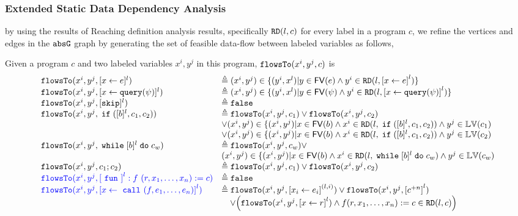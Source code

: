 \subsubsection{Extended Static Data Dependency Analysis}
\label{sec:refine-static-datadep}
by using the results of Reaching definition analysis results, specifically $\mathtt{RD}(l, c)$ for every label in a program $c$, we refine the vertices and edges in the $\mathtt{abs}{\mathtt{G}}$ graph 
by generating the set of feasible data-flow between labeled variables as follows,
\begin{defn}
  \label{def:feasible_flowsto}
  Given a program $c$ and two labeled variables $x^i, y^j$  in this program, 
  $\mathtt{flowsTo}(x^i, y^j, c)$ is 
    {\footnotesize
    \[
   \begin{array}{ll}
    \flowsto(x^i, y^j, \clabel{\assign{x}{\expr}}{}^l)  & \triangleq (x^i, y^j) \in \{ (y^i, x^l) | y \in \mathsf{FV}(\expr) 
    \land y^i \in \live(l, \clabel{\assign{x}{\expr}}^l) \}  \\
    \flowsto(x^i, y^j, \clabel{\assign{x}{\query(\qexpr)}}{}^l)  & \triangleq (x^i, y^j) \in \{ (y^i, x^l) | y \in \mathsf{FV}(\qexpr) 
    \land y^i \in \live(l,\clabel{\assign{x}{\query(\qexpr)}}^l) \}  \\
    \flowsto(x^i, y^j, [\eskip]^{l}) & \triangleq \efalse \\
    \flowsto(x^i, y^j, \eif ([b]^l, c_1, c_2))  & \triangleq \flowsto(x^i, y^j, c_1) \lor \flowsto(x^i, y^j, c_2) \\ 
        & \lor (x^i, y^j) \in
       \{(x^i,y^j) | x \in \mathsf{FV}(b) \land 
      x^i \in \live(l, \eif ([b]^l, c_1, c_2)) \land  y^j \in \lvar(c_1) \\
       &\lor (x^i, y^j) \in \{(x^i,y^j) | x \in \mathsf{FV}(b) \land 
      x^i\in \live(l, \eif ([b]^l, c_1, c_2))  \land  y^j \in \lvar(c_2) \\
       \flowsto(x^i, y^j, \ewhile [b]^l \edo c_w)  & \triangleq  \flowsto(x^i, y^j, c_w)  \lor
       \\ & 
       (x^i, y^j) \in  \{(x^i,y^j) | x \in \mathsf{FV}(b) \land 
      x^i \in \live(l,   \ewhile [b]^l \edo c_w) \land  y^j \in \lvar(c_w) \\
      \flowsto(x^i, y^j, c_1 ;c_2)  & \triangleq \flowsto(x^i, y^j, c_1) \lor \flowsto(x^i, y^j, c_2) \\
      {\highlight{\flowsto(x^i, y^j, \clabel{\efun}^l: f ~ (r, x_1, \ldots, x_n) := c) }}
       & \triangleq \efalse\\
       {\highlight{\flowsto(x^i, y^j, \clabel{\assign{x}{\ecall(f, e_1, \ldots, e_n)}}^l )} } 
       &     
       \triangleq
       \flowsto(x^i, y^j, \clabel{\assign{x_i}{e_i}}^{(l,i)}) \lor
       \flowsto(x^i, y^j, \clabel{c^{+n}}^l) 
       \\ & \quad
       \lor
       \left(\flowsto(x^i, y^j, \clabel{\assign{x}{r}}^{l}) 
       \land f(r, x_1, \ldots, x_n) := c\in \live(l, c) \right)
   \end{array}
   \]
   }
   \end{defn}
